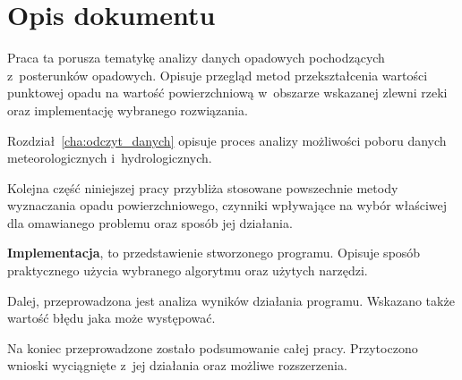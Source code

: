 \section{Opis dokumentu}

Praca ta porusza tematykę analizy danych opadowych pochodzących z~posterunków opadowych. Opisuje przegląd metod przekształcenia wartości punktowej opadu na wartość powierzchniową w~obszarze wskazanej zlewni rzeki oraz implementację wybranego rozwiązania.



Rozdział~\ref{cha:odczyt_danych} opisuje proces analizy możliwości poboru danych meteorologicznych i~hydrologicznych.



Kolejna część niniejszej pracy przybliża stosowane powszechnie metody wyznaczania opadu powierzchniowego, czynniki wpływające na wybór właściwej dla omawianego problemu oraz sposób jej działania.



\textbf{Implementacja}, to przedstawienie stworzonego programu. Opisuje sposób praktycznego użycia wybranego algorytmu oraz użytych narzędzi.




Dalej, przeprowadzona jest analiza wyników działania programu. Wskazano także wartość błędu jaka może występować.



Na koniec przeprowadzone zostało podsumowanie całej pracy. Przytoczono wnioski wyciągnięte z~jej działania oraz możliwe rozszerzenia.

